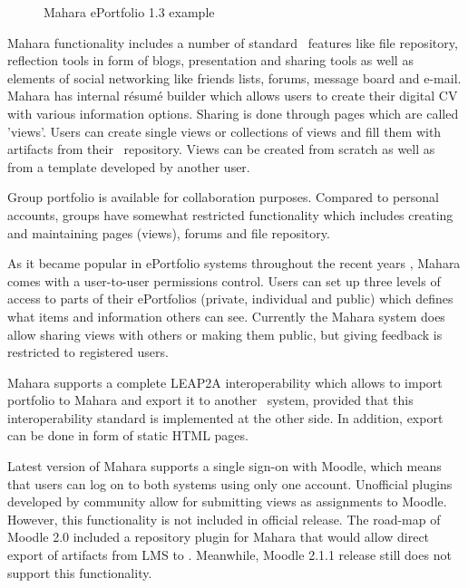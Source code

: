 \begin{figure}[htb]
\centering
\setlength\fboxsep{0pt}
\setlength\fboxrule{0.5pt}
\caption{Mahara ePortfolio 1.3 example}
\label{fig:maharaep}
\end{figure}

Mahara functionality includes a number of standard \ep~features like file
repository, reflection tools in form of blogs, presentation and sharing tools as
well as elements of social networking like friends lists, forums, message board
and e-mail. Mahara has internal r\'{e}sum\'{e} builder which allows users to
create their digital CV with various information options. Sharing is done
through pages which are called 'views'. Users can create single views or
collections of views and fill them with artifacts from their \ep~repository.
Views can be created from scratch as well as from a template developed by
another user.

Group portfolio is available for collaboration purposes. Compared to personal
accounts, groups have somewhat restricted functionality which includes creating
and maintaining pages (views), forums and file repository. 

As it became popular in ePortfolio systems throughout the recent years
\citep{Waters2009}, Mahara comes with a user-to-user permissions control. Users
can set up three levels of access to parts of their ePortfolios (private,
individual and public) which defines what items and information others can see.
Currently the Mahara system does allow sharing views with others or making them
public, but giving feedback is restricted to registered users.

Mahara supports a complete LEAP2A interoperability which allows to import
portfolio to Mahara and export it to another \ep~system, provided that this
interoperability standard is implemented at the other side. In addition, export
can be done in form of static HTML pages.

Latest version of Mahara supports a single sign-on with Moodle, which means that
users can log on to both systems using only one account. Unofficial plugins
developed by community allow for submitting views as assignments to Moodle.
However, this functionality is not included in official release. The road-map of
Moodle 2.0 included a repository plugin for Mahara that would allow direct
export of artifacts from LMS to \ep. Meanwhile, Moodle 2.1.1 release still does
not support this functionality.

